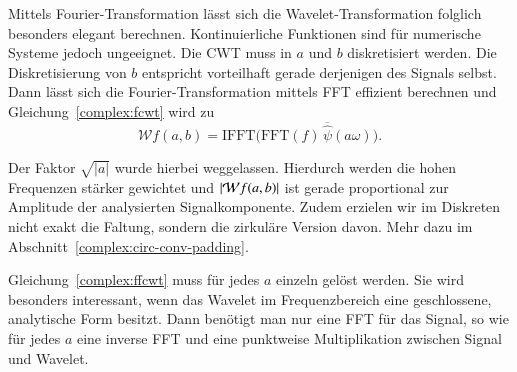 Mittels Fourier-Transformation lässt sich die Wavelet-Transformation folglich besonders elegant berechnen.
Kontinuierliche Funktionen sind für numerische Systeme jedoch ungeeignet.
Die CWT muss in $a$ und $b$ diskretisiert werden.
Die Diskretisierung von $b$ entspricht vorteilhaft gerade derjenigen des Signals selbst.
Dann lässt sich die Fourier-Transformation mittels FFT effizient berechnen und Gleichung~\eqref{complex:fcwt} wird zu
\begin{equation}
	\mathcal{W}f(a,b) = \text{IFFT}\bigl(\text{FFT}(f) \, \overline{\hat{\psi}}(a\omega)\bigr). \label{complex:ffcwt}
\end{equation}

Der Faktor $\sqrt{|a|}$ wurde hierbei weggelassen.
Hierdurch werden die hohen Frequenzen stärker gewichtet und $|\!\Wave f(a,b)|$ ist gerade proportional zur Amplitude der analysierten Signalkomponente.
Zudem erzielen wir im Diskreten nicht exakt die Faltung, sondern die zirkuläre Version davon. 
Mehr dazu im Abschnitt~\ref{complex:circ-conv-padding}.

Gleichung~\eqref{complex:ffcwt} muss für jedes $a$ einzeln gelöst werden.
Sie wird besonders interessant, wenn das Wavelet im Frequenzbereich eine geschlossene, analytische Form besitzt.
Dann benötigt man nur eine FFT für das Signal, so wie für jedes $a$ eine inverse FFT und eine punktweise Multiplikation zwischen Signal und Wavelet.

